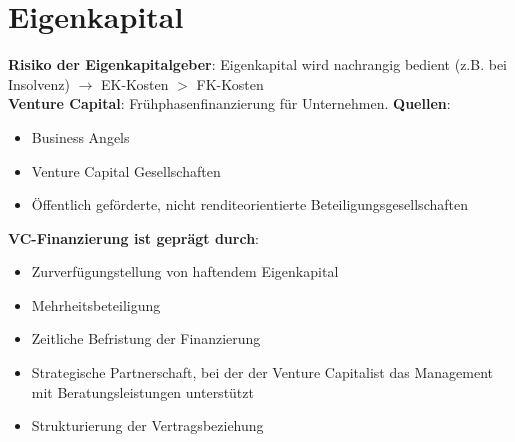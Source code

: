 \section{Eigenkapital}

\textbf{Risiko der Eigenkapitalgeber}: Eigenkapital wird nachrangig bedient (z.B. bei Insolvenz) $\rightarrow$ EK-Kosten $>$ FK-Kosten\\

\textbf{Venture Capital}: Frühphasenfinanzierung für Unternehmen. \textbf{Quellen}:
\begin{itemize}
	\item Business Angels
	\item Venture Capital Gesellschaften
	\item Öffentlich geförderte, nicht renditeorientierte Beteiligungsgesellschaften
\end{itemize}

\textbf{VC-Finanzierung ist geprägt durch}:
\begin{itemize}
	\item Zurverfügungstellung von haftendem Eigenkapital
	\item Mehrheitsbeteiligung
	\item Zeitliche Befristung der Finanzierung 
	\item Strategische Partnerschaft, bei der der Venture Capitalist das Management mit Beratungsleistungen unterstützt
	\item Strukturierung der Vertragsbeziehung
\end{itemize}
\bigskip
